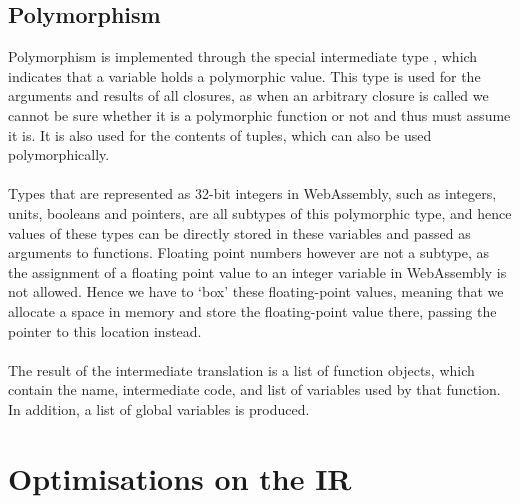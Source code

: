 \subsection{Polymorphism}
Polymorphism is implemented through the special intermediate type , which indicates that a variable holds a polymorphic value. This type is used for the arguments and results of all closures, as when an arbitrary closure is called we cannot be sure whether it is a polymorphic function or not and thus must assume it is. It is also used for the contents of tuples, which can also be used polymorphically. 
\\\\
Types that are represented as 32-bit integers in WebAssembly, such as integers, units, booleans and pointers, are all subtypes of this polymorphic type, and hence values of these types can be directly stored in these variables and passed as arguments to functions. Floating point numbers however are not a subtype, as the assignment of a floating point value to an integer variable in WebAssembly is not allowed. Hence we have to `box' these floating-point values, meaning that we allocate a space in memory and store the floating-point value there, passing the pointer to this location instead.
\\\\
The result of the intermediate translation is a list of function objects, which contain the name, intermediate code, and list of variables used by that function. In addition, a list of global variables is produced.





\section{Optimisations on the IR}

